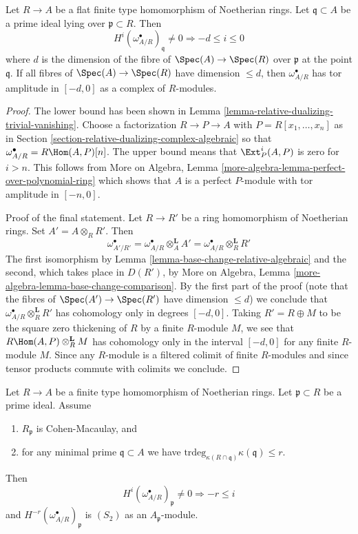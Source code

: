 \begin{lemma}
\label{lemma-relative-dualizing-flat-vanishing}
Let $R \to A$ be a flat finite type homomorphism of Noetherian rings.
Let $\mathfrak q \subset A$ be a prime ideal lying over
$\mathfrak p \subset R$. Then
$$
H^i(\omega_{A/R}^\bullet)_\mathfrak q \not = 0
\Rightarrow - d \leq i \leq 0
$$
where $d$ is the dimension of the fibre of $\Spec(A) \to \Spec(R)$
over $\mathfrak p$ at the point $\mathfrak q$. If all fibres of
$\Spec(A) \to \Spec(R)$ have dimension $\leq d$, then
$\omega_{A/R}^\bullet$ has tor amplitude in $[-d, 0]$
as a complex of $R$-modules.
\end{lemma}

\begin{proof}
The lower bound has been shown in
Lemma \ref{lemma-relative-dualizing-trivial-vanishing}.
Choose a factorization $R \to P \to A$ with $P = R[x_1, \ldots, x_n]$
as in Section \ref{section-relative-dualizing-complex-algebraic}
so that $\omega_{A/R}^\bullet = R\Hom(A, P)[n]$.
The upper bound means that $\Ext^i_P(A, P)$ is zero for $i > n$.
This follows from
More on Algebra, Lemma \ref{more-algebra-lemma-perfect-over-polynomial-ring}
which shows that $A$ is a perfect $P$-module with
tor amplitude in $[-n, 0]$.

\medskip\noindent
Proof of the final statement. Let $R \to R'$ be a ring homomorphism
of Noetherian rings. Set $A' = A \otimes_R R'$. Then
$$
\omega_{A'/R'}^\bullet =
\omega_{A/R}^\bullet \otimes_A^\mathbf{L} A' =
\omega_{A/R}^\bullet \otimes_R^\mathbf{L} R'
$$
The first isomorphism by Lemma \ref{lemma-base-change-relative-algebraic}
and the second, which takes place in $D(R')$, by
More on Algebra, Lemma \ref{more-algebra-lemma-base-change-comparison}.
By the first part of the proof
(note that the fibres of $\Spec(A') \to \Spec(R')$ have dimension $\leq d$)
we conclude that $\omega_{A/R}^\bullet \otimes_R^\mathbf{L} R'$
has cohomology only in degrees $[-d, 0]$. Taking $R' = R \oplus M$
to be the square zero thickening of $R$ by a finite $R$-module $M$,
we see that $R\Hom(A, P) \otimes_R^\mathbf{L} M$
has cohomology only in the interval $[-d, 0]$ for any finite $R$-module $M$.
Since any $R$-module is a filtered colimit of finite $R$-modules
and since tensor products commute with colimits we conclude.
\end{proof}

\begin{lemma}
\label{lemma-relative-dualizing-CM-vanishing}
Let $R \to A$ be a finite type homomorphism of Noetherian rings.
Let $\mathfrak p \subset R$ be a prime ideal. Assume
\begin{enumerate}
\item $R_\mathfrak p$ is Cohen-Macaulay, and
\item for any minimal prime $\mathfrak q \subset A$ we have
$\text{trdeg}_{\kappa(R \cap \mathfrak q)} \kappa(\mathfrak q) \leq r$.
\end{enumerate}
Then
$$
H^i(\omega_{A/R}^\bullet)_\mathfrak p \not = 0 \Rightarrow - r \leq i
$$
and $H^{-r}(\omega_{A/R}^\bullet)_\mathfrak p$ is $(S_2)$
as an $A_\mathfrak p$-module.
\end{lemma}

